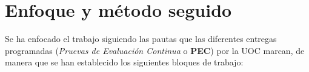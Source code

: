 \documentclass[IB,BIB]{TFUOC}%
\begin{document}
% 
% 


\section{Enfoque y método seguido}





%

Se ha enfocado el trabajo siguiendo las pautas que las diferentes entregas programadas (\textit{Pruevas de Evaluación Continua} o \textbf{PEC}) por la UOC marcan, de manera que se han establecido los siguientes bloques de trabajo:
\end{document}
